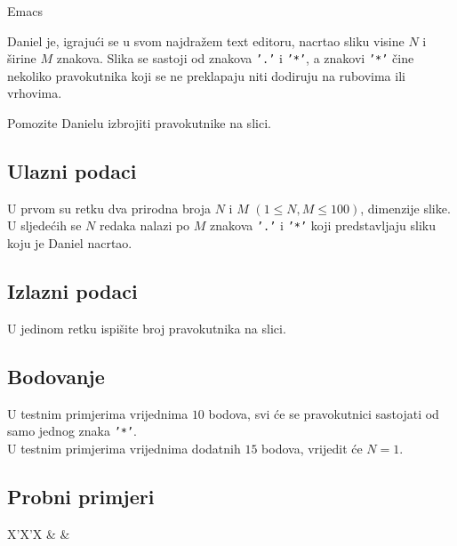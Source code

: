\begin{statement}[
  problempoints=50,
  timelimit=1 sekunda,
  memorylimit=512 MiB,
]{Emacs}


Daniel je, igrajući se u svom najdražem text editoru, nacrtao sliku visine $N$
i širine $M$ znakova. Slika se sastoji od znakova \texttt{'.'} i
\texttt{'*'}, a znakovi \texttt{'*'} čine nekoliko pravokutnika koji se ne
preklapaju niti dodiruju na rubovima ili vrhovima.

Pomozite Danielu izbrojiti pravokutnike na slici.

\subsection*{Ulazni podaci}
U prvom su retku dva prirodna broja $N$ i $M$ $(1 \le N, M \le 100)$, dimenzije
slike.\\
U sljedećih se $N$ redaka nalazi po $M$ znakova \texttt{'.'} i
\texttt{'*'} koji predstavljaju sliku koju je Daniel nacrtao.

\subsection*{Izlazni podaci}
U jedinom retku ispišite broj pravokutnika na slici.

\subsection*{Bodovanje}
U testnim primjerima vrijednima $10$ bodova, svi će se pravokutnici sastojati
od samo jednog znaka \texttt{'*'}.\\
U testnim primjerima vrijednima dodatnih $15$ bodova, vrijedit će $N = 1$.

\subsection*{Probni primjeri}
\begin{tabularx}{\textwidth}{X'X'X}
 &
 &
\end{tabularx}

\end{statement}

